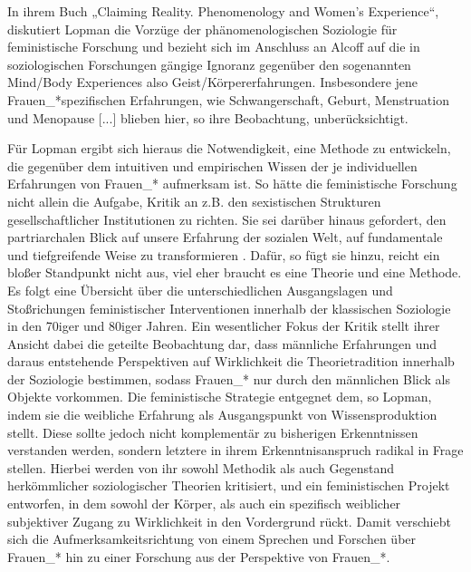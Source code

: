 In ihrem Buch „Claiming Reality. Phenomenology and Women's Experience“,
diskutiert Lopman die Vorzüge der phänomenologischen Soziologie für
feministische Forschung und bezieht sich im Anschluss an Alcoff auf die in
soziologischen Forschungen gängige Ignoranz gegenüber den sogenannten
\glqq Mind/Body Experiences \grqq also Geist/Körpererfahrungen. Insbesondere jene
Frauen\_*spezifischen Erfahrungen, wie \glqq Schwangerschaft, Geburt, Menstruation
und Menopause [...]\grqq \footnotemark {} blieben hier, so ihre Beobachtung, unberücksichtigt.

Für Lopman ergibt sich hieraus die Notwendigkeit, eine Methode zu entwickeln,
die gegenüber dem \glqq intuitiven und empirischen Wissen \grqq \footnotemark
{}  der je individuellen
Erfahrungen von Frauen\_* aufmerksam ist. So hätte die feministische Forschung
nicht allein die Aufgabe, Kritik an z.B. den sexistischen Strukturen
gesellschaftlicher Institutionen zu richten. Sie sei darüber hinaus gefordert,
\glqq den partriarchalen Blick auf unsere Erfahrung der sozialen Welt, auf
fundamentale und tiefgreifende Weise zu transformieren \grqq . Dafür, so fügt sie
hinzu, reicht ein bloßer Standpunkt nicht aus, viel eher braucht es eine
Theorie und eine Methode. Es folgt eine Übersicht über die unterschiedlichen
Ausgangslagen und Stoßrichungen feministischer Interventionen innerhalb der
klassischen Soziologie in den 70iger und 80iger Jahren. Ein wesentlicher Fokus
der Kritik stellt ihrer Ansicht dabei die geteilte Beobachtung dar, dass
männliche Erfahrungen und daraus entstehende Perspektiven auf Wirklichkeit die
Theorietradition innerhalb der Soziologie bestimmen, sodass Frauen\_* nur durch
den männlichen Blick als Objekte vorkommen. Die feministische Strategie
entgegnet dem, so Lopman, indem sie die weibliche Erfahrung als Ausgangspunkt
von Wissensproduktion stellt. Diese sollte jedoch nicht komplementär zu
bisherigen Erkenntnissen verstanden werden, sondern letztere in ihrem
Erkenntnisanspruch radikal in Frage stellen. Hierbei werden von ihr sowohl
Methodik als auch Gegenstand herkömmlicher soziologischer Theorien kritisiert,
und ein feministischen Projekt entworfen, in dem sowohl der Körper, als auch
ein spezifisch weiblicher subjektiver Zugang zu Wirklichkeit in den Vordergrund
rückt. Damit verschiebt sich die Aufmerksamkeitsrichtung von einem Sprechen und
Forschen über Frauen\_* hin zu einer Forschung aus der Perspektive von
Frauen\_*. \footnotemark {}

